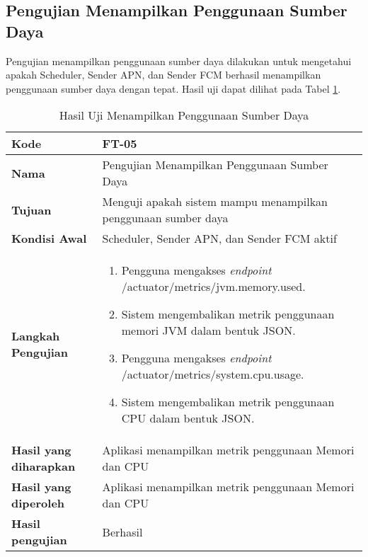 \subsection{Pengujian Menampilkan Penggunaan Sumber Daya}
\par Pengujian menampilkan penggunaan sumber daya dilakukan untuk mengetahui apakah Scheduler, Sender APN, dan Sender FCM berhasil menampilkan penggunaan sumber daya dengan tepat. Hasil uji dapat dilihat pada Tabel \ref{t:uji_menampilkan_penggunaan_sumber_daya}.
\begin{longtable}{|p{3cm}|p{6.5cm}|}
	\caption{Hasil Uji Menampilkan Penggunaan Sumber Daya} \label{t:uji_menampilkan_penggunaan_sumber_daya} \\ \hline
	\textbf{Kode} & FT-05 \\ \hline
	\textbf{Nama} & Pengujian Menampilkan Penggunaan Sumber Daya \\ \hline
	\textbf{Tujuan} & Menguji apakah sistem mampu menampilkan penggunaan sumber daya \\ \hline
	\textbf{Kondisi Awal} & Scheduler, Sender APN, dan Sender FCM aktif \\ \hline
	\textbf{Langkah Pengujian} &  
	\begin{enumerate}
		\item Pengguna mengakses \textit{endpoint} /actuator/metrics/jvm.memory.used.
		\item Sistem mengembalikan metrik penggunaan memori JVM dalam bentuk JSON.
		\item Pengguna mengakses \textit{endpoint} /actuator/metrics/system.cpu.usage.
		\item Sistem mengembalikan metrik penggunaan CPU dalam bentuk JSON.
	\end{enumerate} \\ \hline
	\textbf{Hasil yang diharapkan} & Aplikasi menampilkan metrik penggunaan Memori dan CPU \\ \hline
	\textbf{Hasil yang diperoleh} & Aplikasi menampilkan metrik penggunaan Memori dan CPU \\ \hline
	\textbf{Hasil pengujian} & Berhasil \\ \hline
\end{longtable}


